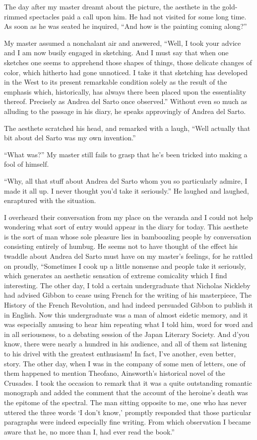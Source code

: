 \documentclass{book}
\begin{document}
The day after my master dreamt about the picture, the aesthete in the
gold-rimmed spectacles paid a call upon him. He had not visited for some
long time. As soon as he was seated he inquired, ``And how is the
painting coming along?''

My master assumed a nonchalant air and answered, ``Well, I took your
advice and I am now busily engaged in sketching. And I must say that
when one sketches one seems to apprehend those shapes of things, those
delicate changes of color, which hitherto had gone unnoticed. I take it
that sketching has developed in the West to its present remarkable
condition solely as the result of the emphasis which, historically, has
always there been placed upon the essentiality thereof. Precisely as
Andrea del Sarto once observed.'' Without even so much as alluding to
the passage in his diary, he speaks approvingly of Andrea del Sarto.

The aesthete scratched his head, and remarked with a laugh, ``Well
actually that bit about del Sarto was my own invention.''

``What was?'' My master still fails to grasp that he's been tricked into
making a fool of himself.

``Why, all that stuff about Andrea del Sarto whom you so particularly
admire, I made it all up. I never thought you'd take it seriously.'' He
laughed and laughed, enraptured with the situation.

I overheard their conversation from my place on the veranda and I could
not help wondering what sort of entry would appear in the diary for
today. This aesthete is the sort of man whose sole pleasure lies in
bamboozling people by conversation consisting entirely of humbug. He
seems not to have thought of the effect his twaddle about Andrea del
Sarto must have on my master's feelings, for he rattled on proudly,
``Sometimes I cook up a little nonsense and people take it seriously,
which generates an aesthetic sensation of extreme comicality which I
find interesting. The other day, I told a certain undergraduate that
Nicholas Nickleby had advised Gibbon to cease using French for the
writing of his masterpiece, The History of the French Revolution, and
had indeed persuaded Gibbon to publish it in English. Now this
undergraduate was a man of almost eidetic memory, and it was especially
amusing to hear him repeating what I told him, word for word and in all
seriousness, to a debating session of the Japan Literary Society. And
d'you know, there were nearly a hundred in his audience, and all of them
sat listening to his drivel with the greatest enthusiasm! In fact, I've
another, even better, story. The other day, when I was in the company of
some men of letters, one of them happened to mention Theofano,
Ainsworth's historical novel of the Crusades. I took the occasion to
remark that it was a quite outstanding romantic monograph and added the
comment that the account of the heroine's death was the epitome of the
spectral. The man sitting opposite to me, one who has never uttered the
three words `I don't know,' promptly responded that those particular
paragraphs were indeed especially fine writing. From which observation I
became aware that he, no more than I, had ever read the book.''
\end{document}
